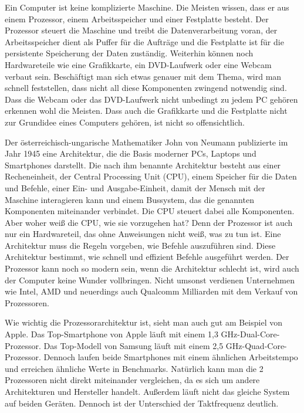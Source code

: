 Ein Computer ist keine komplizierte Maschine. Die Meisten wissen, dass er aus einem Prozessor, einem Arbeitsspeicher und einer Festplatte besteht. Der Prozessor steuert die Maschine und treibt die Datenverarbeitung voran, der Arbeitsspeicher dient als Puffer für die Aufträge und die Festplatte ist für die persistente Speicherung der Daten zuständig. Weiterhin können noch Hardwareteile wie eine Grafikkarte, ein DVD-Laufwerk oder eine Webcam verbaut sein.
Beschäftigt man sich etwas genauer mit dem Thema, wird man schnell feststellen, dass nicht all diese Komponenten zwingend notwendig sind. Dass die Webcam oder das DVD-Laufwerk nicht unbedingt zu jedem PC gehören erkennen wohl die Meisten. Dass auch die Grafikkarte und die Festplatte nicht zur Grundidee eines Computers gehören, ist nicht so offensichtlich.

Der österreichisch-ungarische Mathematiker John von Neumann publizierte im Jahr 1945 eine Architektur, die die Basis moderner PCs, Laptops und Smartphones darstellt.
Die nach ihm benannte Architektur besteht aus einer Recheneinheit, der Central Processing Unit (CPU), einem Speicher für die Daten und Befehle, einer Ein- und Ausgabe-Einheit, damit der Mensch mit der Maschine interagieren kann und einem Bussystem, das die genannten Komponenten miteinander verbindet. Die CPU steuert dabei alle Komponenten. Aber woher weiß die CPU, wie sie vorzugehen hat? Denn der Prozessor ist auch nur ein Hardwareteil, das ohne Anweisungen nicht weiß, was zu tun ist. Eine Architektur muss die Regeln vorgeben, wie Befehle auszuführen sind. Diese Architektur bestimmt, wie schnell und effizient Befehle ausgeführt werden. Der Prozessor kann noch so modern sein, wenn die Architektur schlecht ist, wird auch der Computer keine Wunder vollbringen. Nicht umsonst verdienen Unternehmen wie Intel, AMD und neuerdings auch Qualcomm Milliarden mit dem Verkauf von Prozessoren. 

Wie wichtig die Prozessorarchitektur ist, sieht man auch gut am Beispiel von Apple. Das Top-Smartphone von Apple läuft mit einem 1,3 GHz-Dual-Core-Prozessor. Das Top-Modell von Samsung läuft mit einem 2,5 GHz-Quad-Core-Prozessor. Dennoch laufen beide Smartphones mit einem ähnlichen Arbeitstempo und erreichen ähnliche Werte in Benchmarks. Natürlich kann man die 2 Prozessoren nicht direkt miteinander vergleichen, da es sich um andere Architekturen und Hersteller handelt. Außerdem läuft nicht das gleiche System auf beiden Geräten. Dennoch ist der Unterschied der Taktfrequenz deutlich.

